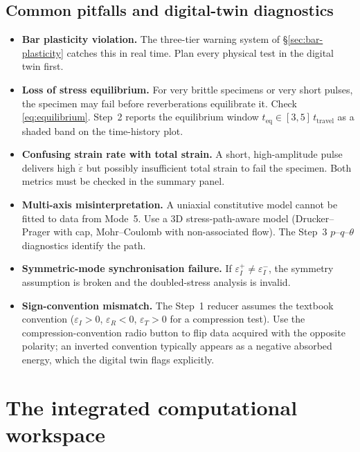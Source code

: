\documentclass[11pt,a4paper,openany]{book}
\theoremstyle{handbook}
\newcommand{\eps}{\varepsilon}
\newcommand{\epsdot}{\dot\eps}
\begin{document}
\section{Common pitfalls and digital-twin diagnostics}

\begin{itemize}[leftmargin=*,itemsep=3pt]
  \item \textbf{Bar plasticity violation.} The three-tier warning system of
        \S\ref{sec:bar-plasticity} catches this in real time. Plan every
        physical test in the digital twin first.
  \item \textbf{Loss of stress equilibrium.} For very brittle specimens or
        very short pulses, the specimen may fail before reverberations
        equilibrate it. Check \eqref{eq:equilibrium}. Step~2 reports the
        equilibrium window $t_{\text{eq}}\in[3,5]\,t_{\text{travel}}$ as a
        shaded band on the time-history plot.
  \item \textbf{Confusing strain rate with total strain.} A short,
        high-amplitude pulse delivers high $\epsdot$ but possibly
        insufficient total strain to fail the specimen. Both metrics must
        be checked in the summary panel.
  \item \textbf{Multi-axis misinterpretation.} A uniaxial constitutive model
        cannot be fitted to data from Mode~5. Use a 3D stress-path-aware
        model (Drucker--Prager with cap, Mohr--Coulomb with non-associated
        flow). The Step~3 $p$--$q$--$\theta$ diagnostics identify the
        path.
  \item \textbf{Symmetric-mode synchronisation failure.} If
        $\eps_I^{+}\neq\eps_I^{-}$, the symmetry assumption is broken and
        the doubled-stress analysis is invalid.
  \item \textbf{Sign-convention mismatch.} The Step~1 reducer assumes the
        textbook convention ($\eps_I>0$, $\eps_R<0$, $\eps_T>0$ for a
        compression test). Use the compression-convention radio button to
        flip data acquired with the opposite polarity; an inverted
        convention typically appears as a negative absorbed energy, which
        the digital twin flags explicitly.
\end{itemize}

\chapter{The integrated computational workspace}\label{ch:integrated}
\end{document}

